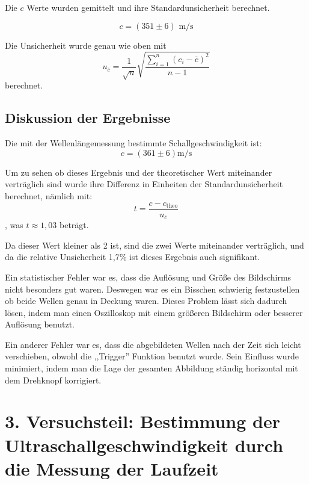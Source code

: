 \documentclass[11pt,a4paper]{article}
\begin{document}
Die $c$ Werte wurden gemittelt und ihre Standardunsicherheit berechnet. 

$$ c = (351 \pm 6) \textrm{ m/s}$$

Die Unsicherheit wurde genau wie oben mit
$$u_{\bar{c}} = \frac{1}{\sqrt{n}} \sqrt{\frac{\sum_{i=1}^{n}(c_i-\bar{c})^2}{n-1}}$$
berechnet. 




\subsection{Diskussion der Ergebnisse}


Die mit der Wellenlängemessung bestimmte Schallgeschwindigkeit ist:
$$ c = (361 \pm 6) \textrm{m/s} $$

Um zu sehen ob dieses Ergebnis und der theoretischer Wert miteinander verträglich sind wurde ihre Differenz in Einheiten der Standardunsicherheit berechnet, nämlich mit:
$$ t = \frac{c - c_\textrm{theo}}{u_{\bar{c}}} $$
, was $t \approx 1,03 $ beträgt. 
	
Da dieser Wert kleiner als 2 ist, sind die zwei Werte miteinander verträglich, und da die relative Unsicherheit 1,7\% ist dieses Ergebnis auch signifikant. 

Ein statistischer Fehler war es, dass die Auflösung und Größe des Bildschirms nicht besonders gut waren. Deswegen war es ein Bisschen schwierig festzustellen ob beide Wellen genau in Deckung waren. Dieses Problem lässt sich dadurch lösen, indem man einen Oszilloskop mit einem größeren Bildschirm oder besserer Auflösung benutzt. 

Ein anderer Fehler war es, dass die abgebildeten Wellen nach der Zeit sich leicht verschieben, obwohl die ,,Trigger'' Funktion benutzt wurde. Sein Einfluss wurde minimiert, indem man die Lage der gesamten Abbildung ständig horizontal mit dem Drehknopf korrigiert. 





\section{3. Versuchsteil: Bestimmung der Ultraschallgeschwindigkeit durch die Messung der Laufzeit}
\end{document}
